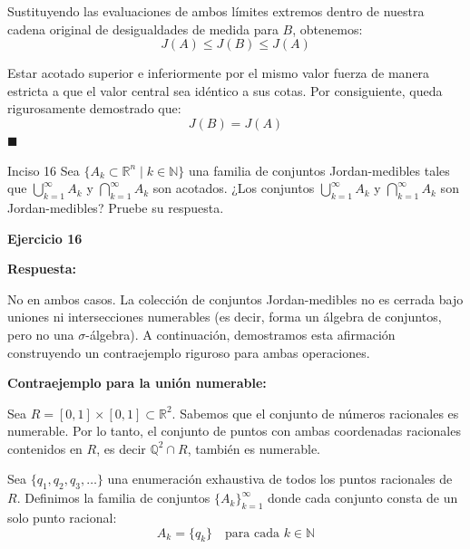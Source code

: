 \documentclass[11pt,letterpaper]{article}
\begin{document}
Sustituyendo las evaluaciones de ambos límites extremos dentro de nuestra cadena original de desigualdades de medida para $B$, obtenemos:
\begin{equation*}
J(A) \le J(B) \le J(A)
\end{equation*}

Estar acotado superior e inferiormente por el mismo valor fuerza de manera estricta a que el valor central sea idéntico a sus cotas. Por consiguiente, queda rigurosamente demostrado que:
\begin{equation*}
J(B) = J(A)
\end{equation*}
\hfill $\blacksquare$

\begin{inciso}{Inciso 16}
Sea $\{A_{k}\subset\mathbb{R}^{n}\mid k\in\mathbb{N}\}$ una familia de conjuntos Jordan-medibles tales que $\bigcup_{k=1}^{\infty}A_{k}$ y $\bigcap_{k=1}^{\infty}A_{k}$ son acotados. ¿Los conjuntos $\bigcup_{k=1}^{\infty}A_{k}$ y $\bigcap_{k=1}^{\infty}A_{k}$ son Jordan-medibles? Pruebe su respuesta.
\end{inciso}

\textbf{Ejercicio 16}

\textbf{Respuesta:} 

No en ambos casos. La colección de conjuntos Jordan-medibles no es cerrada bajo uniones ni intersecciones numerables (es decir, forma un álgebra de conjuntos, pero no una $\sigma$-álgebra). A continuación, demostramos esta afirmación construyendo un contraejemplo riguroso para ambas operaciones.

\vspace{0.5cm}
\textbf{Contraejemplo para la unión numerable:}

Sea $R = [0,1] \times [0,1] \subset \mathbb{R}^2$. Sabemos que el conjunto de números racionales es numerable. Por lo tanto, el conjunto de puntos con ambas coordenadas racionales contenidos en $R$, es decir $\mathbb{Q}^2 \cap R$, también es numerable. 

Sea $\{q_1, q_2, q_3, \dots\}$ una enumeración exhaustiva de todos los puntos racionales de $R$. Definimos la familia de conjuntos $\{A_k\}_{k=1}^{\infty}$ donde cada conjunto consta de un solo punto racional:
\begin{equation*}
A_k = \{q_k\} \quad \text{para cada } k \in \mathbb{N}
\end{equation*}
\end{document}
